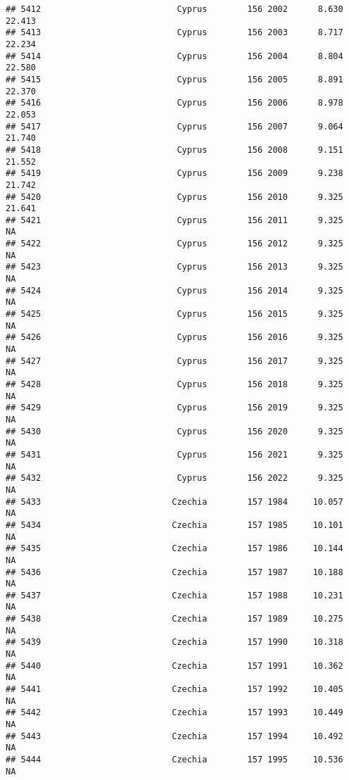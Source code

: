 \documentclass[
]{article}
\begin{document}
\begin{verbatim}
## 5412                           Cyprus        156 2002      8.630     22.413
## 5413                           Cyprus        156 2003      8.717     22.234
## 5414                           Cyprus        156 2004      8.804     22.580
## 5415                           Cyprus        156 2005      8.891     22.370
## 5416                           Cyprus        156 2006      8.978     22.053
## 5417                           Cyprus        156 2007      9.064     21.740
## 5418                           Cyprus        156 2008      9.151     21.552
## 5419                           Cyprus        156 2009      9.238     21.742
## 5420                           Cyprus        156 2010      9.325     21.641
## 5421                           Cyprus        156 2011      9.325         NA
## 5422                           Cyprus        156 2012      9.325         NA
## 5423                           Cyprus        156 2013      9.325         NA
## 5424                           Cyprus        156 2014      9.325         NA
## 5425                           Cyprus        156 2015      9.325         NA
## 5426                           Cyprus        156 2016      9.325         NA
## 5427                           Cyprus        156 2017      9.325         NA
## 5428                           Cyprus        156 2018      9.325         NA
## 5429                           Cyprus        156 2019      9.325         NA
## 5430                           Cyprus        156 2020      9.325         NA
## 5431                           Cyprus        156 2021      9.325         NA
## 5432                           Cyprus        156 2022      9.325         NA
## 5433                          Czechia        157 1984     10.057         NA
## 5434                          Czechia        157 1985     10.101         NA
## 5435                          Czechia        157 1986     10.144         NA
## 5436                          Czechia        157 1987     10.188         NA
## 5437                          Czechia        157 1988     10.231         NA
## 5438                          Czechia        157 1989     10.275         NA
## 5439                          Czechia        157 1990     10.318         NA
## 5440                          Czechia        157 1991     10.362         NA
## 5441                          Czechia        157 1992     10.405         NA
## 5442                          Czechia        157 1993     10.449         NA
## 5443                          Czechia        157 1994     10.492         NA
## 5444                          Czechia        157 1995     10.536         NA

\end{verbatim}
\end{document}
